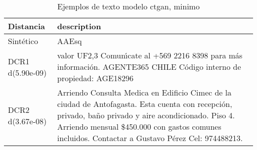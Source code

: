 \begin{table}[H]
\centering
\fontsize{10}{14}\selectfont
\caption{Ejemplos de texto modelo ctgan, minimo}
\label{table-example-economicos-a-3-ctgan-min-text}
\begin{tabular}{|l|m{35em}|}
\hline
\rowcolor[gray]{0.8}
Distancia & description \\
\hline Sintético & AAEsq \\
\hline DCR1 d(5.90e-09) & valor UF2,3 Comun{\'\i}cate al +569 2216 8398 para m\'as informaci\'on. AGENTE365 CHILE C\'odigo interno de propiedad: AGE18296 \\
\hline DCR2 d(3.67e-08) & Arriendo Consulta Medica en Edificio Cimec de la ciudad de Antofagasta. Esta cuenta con recepci\'on, privado, ba\~no privado y aire acondicionado. Piso 4. Arriendo mensual \$450.000 con gastos comunes incluidos.
Contactar a Gustavo P\'erez Cel: 974488213. \\
\hline
\end{tabular}
\end{table}
